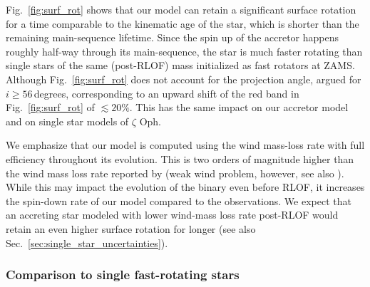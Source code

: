 \documentclass[twocolumn,twocolappendix,trackchanges]{aastex63}
\DeclareRobustCommand{\Figref}[1]{Fig.~\ref{#1}}
\DeclareRobustCommand{\Secref}[1]{Sec.~\ref{#1}}
\newcommand{\zoph}{$\zeta$ Oph}
\begin{document}
\Figref{fig:surf_rot} shows that our model can retain a significant surface rotation for a time comparable to the kinematic age of the star, which is shorter than the remaining main-sequence lifetime. Since the spin up of the accretor happens roughly half-way through its main-sequence, the star is much faster rotating than single stars of the same (post-RLOF) mass initialized as fast rotators at ZAMS. Although \Figref{fig:surf_rot} does not account for the projection angle, \cite{zehe:18} argued for
$i\geq56$\,degrees, corresponding to an upward shift of the red band in \Figref{fig:surf_rot} of $\lesssim
20\%$. This has the same impact on our accretor model and on single star models of \zoph.

We emphasize that our model is computed using the \cite{vink:00,
  vink:01} wind mass-loss rate with full efficiency throughout its
evolution. This is two orders of magnitude higher than the wind mass
loss rate reported by \cite{marcolino:09} (weak wind problem,
however, see also \citealt{lucy:12, lagae:21}). While this may impact
the evolution of the binary even before RLOF, it increases the
spin-down rate of our model compared to the observations. We expect
that an accreting star modeled with lower wind-mass loss rate
post-RLOF would retain an even higher surface rotation for longer (see
also \Secref{sec:single_star_uncertainties}).


\subsubsection{Comparison to single fast-rotating stars}
\end{document}
